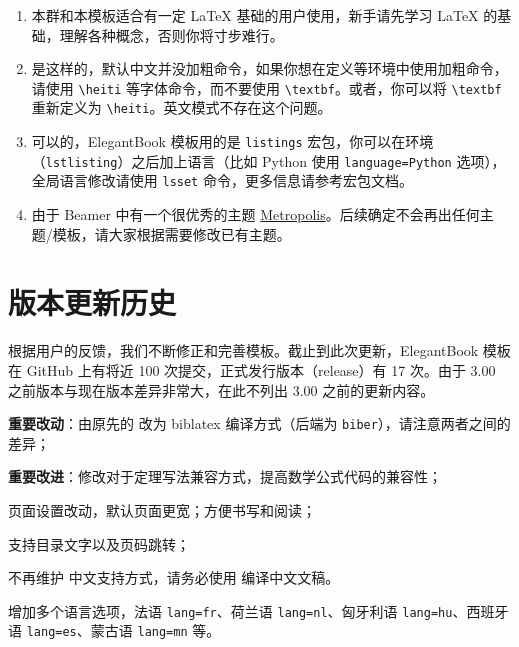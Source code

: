 \documentclass[cn,10pt,math=newtx,citestyle=gb7714-2015,bibstyle=gb7714-2015]{elegantbook}
\begin{document}
\begin{enumerate}[itemsep=1.5ex]
    模板的使用修改都是自由的，你们声明模板来源以及模板地址（GitHub 地址）即可，其他未尽事宜按照开源协议 LPPL-1.3c。做好之后，如果方便的话，可以给我们一个链接，我把你们的教材放在 Elegant\LaTeX{} 用户作品集里。
  \item {}
    本群和本模板适合有一定 \LaTeX{} 基础的用户使用，新手请先学习 \LaTeX{} 的基础，理解各种概念，否则你将寸步难行。
  \item {}
    是这样的，默认中文并没加粗命令，如果你想在定义等环境中使用加粗命令，请使用 \lstinline{\heiti} 等字体命令，而不要使用 \lstinline{\textbf}。或者，你可以将 \lstinline|\textbf| 重新定义为 \lstinline|\heiti|。英文模式不存在这个问题。
  \item {}
    可以的，ElegantBook 模板用的是 \lstinline{listings} 宏包，你可以在环境（\lstinline{lstlisting}）之后加上语言（比如 Python 使用 \lstinline{language=Python} 选项），全局语言修改请使用 \lstinline{lsset} 命令，更多信息请参考宏包文档。
  \item {}
    由于 Beamer 中有一个很优秀的主题 \href{https://github.com/matze/mtheme}{Metropolis}。后续确定不会再出任何主题/模板，请大家根据需要修改已有主题。
\end{enumerate}

\chapter{版本更新历史}

根据用户的反馈，我们不断修正和完善模板。截止到此次更新，ElegantBook 模板在 GitHub 上有将近 100 次提交，正式发行版本（release）有 17 次。由于 3.00 之前版本与现在版本差异非常大，在此不列出 3.00 之前的更新内容。



\begin{change}
  \item \textbf{重要改动}：由原先的  改为 biblatex 编译方式（后端为 \lstinline{biber}），请注意两者之间的差异；
  \item \textbf{重要改进}：修改对于定理写法兼容方式，提高数学公式代码的兼容性；
  \item 页面设置改动，默认页面更宽；方便书写和阅读；
  \item 支持目录文字以及页码跳转；
  \item 不再维护  中文支持方式，请务必使用  编译中文文稿。
  \item 增加多个语言选项，法语 \lstinline{lang=fr}、荷兰语 \lstinline{lang=nl}、匈牙利语 \lstinline{lang=hu}、西班牙语 \lstinline{lang=es}、蒙古语 \lstinline{lang=mn} 等。
\end{change}
\end{document}
